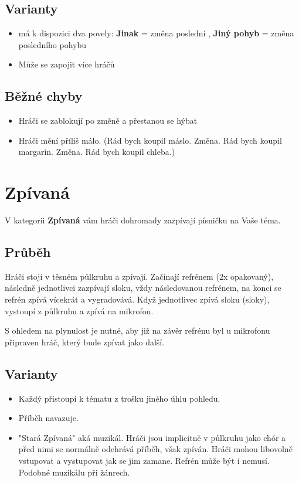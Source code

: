 \documentclass[main.tex]{subfiles}
\begin{document}
\subsection{ Varianty } \begin{itemize}
\item  {} má k dispozici dva povely: \textbf{Jinak}{} = změna poslední , \textbf{Jiný pohyb}{} = změna posledního pohybu
\item  Může se zapojit více hráčů
\end{itemize}
 
\subsection{ Běžné chyby } \begin{itemize}
\item Hráči se zablokují po změně a přestanou se hýbat
\item Hráči mění příliš málo.  (Rád bych koupil máslo. Změna. Rád bych koupil margarín. Změna. Rád bych koupil chleba.)
\end{itemize}
 
 
 
 
 
\needspace{5cm} \section{Zpívaná} \label{zpívaná}  
 
 
V kategorii \textbf{Zpívaná}{} vám hráči dohromady zazpívají písničku na Vaše téma. 
 
 
\subsection{Průběh} Hráči stojí v těsném půlkruhu a zpívají. Začínají refrénem (2x opakovaný), následně jednotlivci zazpívají sloku, vždy následovanou refrénem, na konci se refrén zpívá vícekrát a vygradovává. Když jednotlivec zpívá sloku (sloky), vystoupí z půlkruhu a zpívá na mikrofon.  
 
S ohledem na plynulost je nutné, aby již na závěr refrénu byl u mikrofonu připraven hráč, který bude zpívat jako další. 
 
 
\subsection{ Varianty } \begin{itemize}
\item  Každý přistoupí k tématu z trošku jiného úhlu pohledu.
\item  Příběh navazuje.
\item  "Stará Zpívaná"{} aká muzikál. Hráči jsou implicitně v půlkruhu jako chór a před nimi se normálně odehrává příběh, však zpíván. Hráči mohou libovolně vstupovat a vystupovat jak se jim zamane. Refrén může být i nemusí. Podobné muzikálu při žánrech.
\end{itemize}
 
\end{document}
